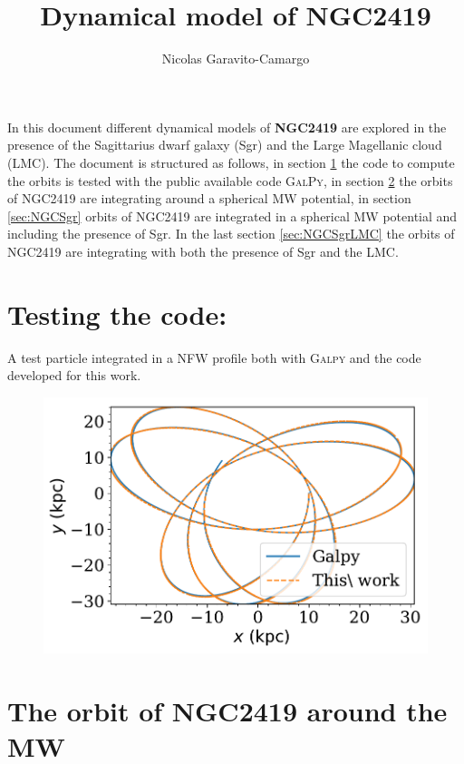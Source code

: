 \documentclass[14pt]{article}
\title{Dynamical model of NGC2419}
\author{Nicolas Garavito-Camargo}
\begin{document}
\maketitle


In this document different dynamical models of \textbf{NGC2419} are explored
in the presence of the Sagittarius dwarf galaxy (Sgr) and the Large
Magellanic cloud (LMC). The document is structured as follows, in section
\ref{sec:test} the code to compute the orbits is tested with the
public available code \textsc{GalPy}, in section \ref{sec:NGC} the
orbits of NGC2419 are integrating around a spherical MW potential,
in section \ref{sec:NGCSgr} orbits of NGC2419 are integrated in a
spherical MW potential and including the presence of Sgr.
 In the last section \ref{sec:NGCSgrLMC} the orbits of NGC2419 are integrating
with both the presence of Sgr and the LMC.

\section{Testing the code:}\label{sec:test}

A test particle integrated in a NFW profile both with \textsc{Galpy}
and the code developed for this work.

\begin{figure}[H]
\centering
\includegraphics[scale=0.5]{../exploratory_code/galpy_test.pdf}
\end{figure}


\section{The orbit of NGC2419 around the MW}\label{sec:NGC}
\end{document}
